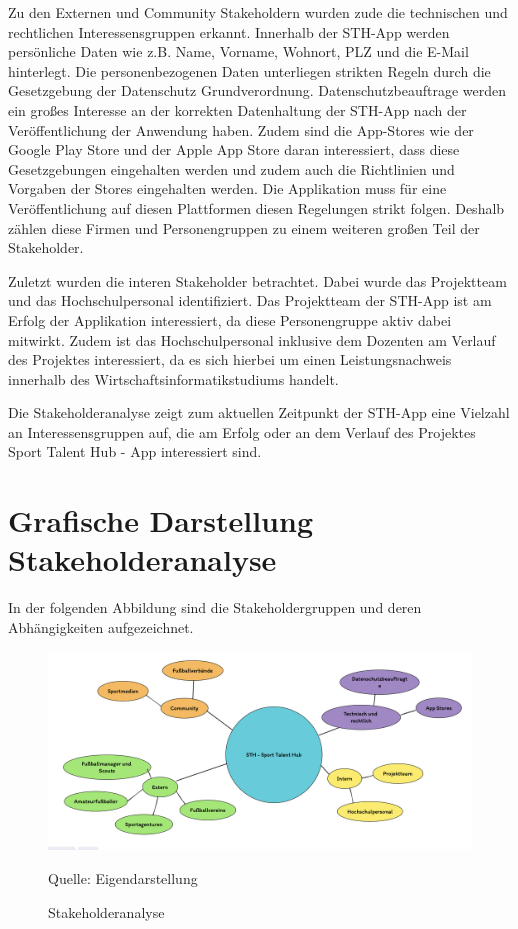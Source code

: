 \noindent
Zu den Externen und Community Stakeholdern wurden zude die technischen und rechtlichen Interessensgruppen erkannt.
Innerhalb der STH-App werden persönliche Daten wie z.B. Name, Vorname, Wohnort, PLZ und die E-Mail hinterlegt.
Die personenbezogenen Daten unterliegen strikten Regeln durch die Gesetzgebung der Datenschutz Grundverordnung.
Datenschutzbeauftrage werden ein großes Interesse an der korrekten Datenhaltung der STH-App nach der Veröffentlichung der Anwendung haben.
Zudem sind die App-Stores wie der Google Play Store und der Apple App Store daran interessiert, dass diese Gesetzgebungen eingehalten werden und zudem auch die Richtlinien und Vorgaben der Stores eingehalten werden.
Die Applikation muss für eine Veröffentlichung auf diesen Plattformen diesen Regelungen strikt folgen.
Deshalb zählen diese Firmen und Personengruppen zu einem weiteren großen Teil der Stakeholder.

\noindent
Zuletzt wurden die interen Stakeholder betrachtet.
Dabei wurde das Projektteam und das Hochschulpersonal identifiziert.
Das Projektteam der STH-App ist am Erfolg der Applikation interessiert, da diese Personengruppe aktiv dabei mitwirkt.
Zudem ist das Hochschulpersonal inklusive dem Dozenten am Verlauf des Projektes interessiert, da es sich hierbei um einen Leistungsnachweis innerhalb des Wirtschaftsinformatikstudiums handelt.

\noindent
Die Stakeholderanalyse zeigt zum aktuellen Zeitpunkt der STH-App eine Vielzahl an Interessensgruppen auf, die am Erfolg oder an dem Verlauf des Projektes Sport Talent Hub - App interessiert sind.


\section{Grafische Darstellung Stakeholderanalyse}

In der folgenden Abbildung sind die Stakeholdergruppen und deren Abhängigkeiten aufgezeichnet.

\begin{figure}[H]
	\caption[Stakeholderanalyse]{Stakeholderanalyse}
	\centering
	\includegraphics[width=1\textwidth]{assets/figures/Stakeholderanalyse.png}
    \begin{flushleft}
		Quelle: Eigendarstellung
	\end{flushleft}
\end{figure}

